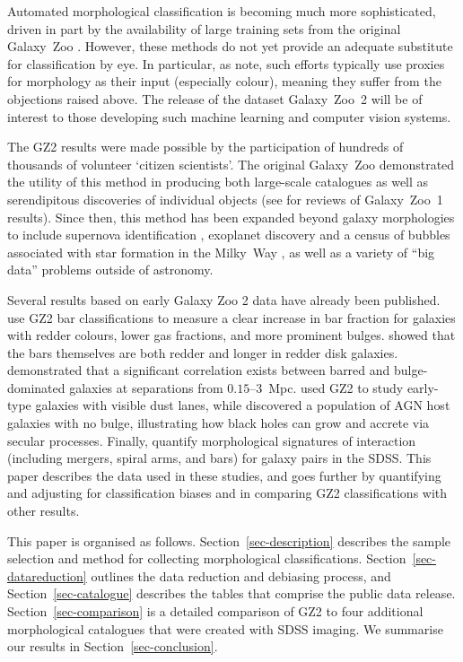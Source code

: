 \documentclass[useAMS,usenatbib]{mn2e}
\begin{document}
Automated morphological classification is becoming much more sophisticated, driven in part by the availability of large training sets from the original Galaxy~Zoo \citep{ban10,hue11,dav13}. However, these methods do not yet provide an adequate substitute for classification by eye. In particular, as \citet{lin11} note, such efforts typically use proxies for morphology as their input (especially colour), meaning they suffer from the objections raised above. The release of the dataset Galaxy~Zoo~2 will be of interest to those developing such machine learning and computer vision systems. 

The GZ2 results were made possible by the participation of hundreds of thousands of volunteer `citizen scientists'. The original Galaxy~Zoo demonstrated the utility of this method in producing both large-scale catalogues as well as serendipitous discoveries of individual objects (see \citealt{lin11,for12} for reviews of Galaxy~Zoo~1 results). Since then, this method has been expanded beyond galaxy morphologies to include supernova identification \citep{smi11}, exoplanet discovery \citep{fis12,sch12} and a census of bubbles associated with star formation in the Milky~Way \citep{sim12a,ken12}, as well as a variety of ``big data'' problems outside of astronomy.%

Several results based on early Galaxy Zoo 2 data have already been published. \citet{mas11c,mas12a} use GZ2 bar classifications to measure a clear increase in bar fraction for galaxies with redder colours, lower gas fractions, and more prominent bulges. \citet{hoy11} showed that the bars themselves are both redder and longer in redder disk galaxies. \citet{ski12} demonstrated that a significant correlation exists between barred and bulge-dominated galaxies at separations from $0.15$--$3$~Mpc. \citet{kav12a} used GZ2 to study early-type galaxies with visible dust lanes, while \citet{sim13} discovered a population of AGN host galaxies with no bulge, illustrating how black holes can grow and accrete via secular processes. Finally, \citet{cas13} quantify morphological signatures of interaction (including mergers, spiral arms, and bars) for galaxy pairs in the SDSS. This paper describes the data used in these studies, and goes further by quantifying and adjusting for classification biases and in comparing GZ2 classifications with other results. 

This paper is organised as follows. Section~\ref{sec-description} describes the sample selection and method for collecting morphological classifications. Section~\ref{sec-datareduction} outlines the data reduction and debiasing process, and Section~\ref{sec-catalogue} describes the tables that comprise the public data release. Section~\ref{sec-comparison} is a detailed comparison of GZ2 to four additional morphological catalogues that were created with SDSS imaging. We summarise our results in Section~\ref{sec-conclusion}. 
\end{document}
